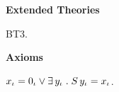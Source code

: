 \begin{biformthy}\em
\bi

  \item[]

  \item[] \textbf{Extended Theories} 

  \be

    \setcounter{enumi}{2}

    \item BT3.

  \ee

  \item[] \textbf{Axioms}

  \be

    \setcounter{enumi}{25}

    \item $x_\iota = 0_\iota \vee \exists\, y_\iota \mathrel. S \,
      y_\iota = x_\iota$.

  \ee

\ei
\end{biformthy}

